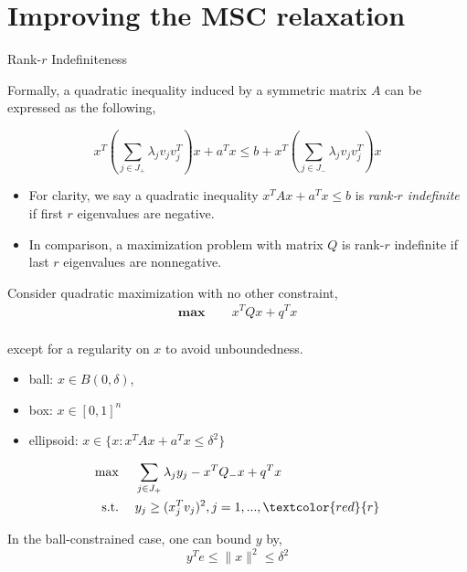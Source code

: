 \documentclass[aspectratio=1610, 9pt]{beamer}
\newcommand{\mx}{\mathbf{\max}\;}
\newcommand{\st}{\mathrm{s.t.\;}}
\newcommand{\red}[1]{\textcolor{red}{#1}}
\begin{document}
\section{Improving the MSC relaxation}
\begin{frame}[allowframebreaks]{Rank-\(r\) Indefiniteness}

  Formally, a quadratic inequality induced by a symmetric matrix \(A\) can be expressed as the following,

  \begin{equation}
    x^T \left(\sum_{j\in J_+} \lambda_j v_jv_j^T\right)x +a^Tx \le b + x^T\left(\sum_{j\in J_-} \lambda_j v_jv_j^T\right)x
  \end{equation}

  \begin{itemize}
    \item For clarity, we say a quadratic inequality \(x^TAx + a^Tx \le b\) is \emph{rank-\(r\) indefinite} if first \(r\) eigenvalues are negative.
    \item In comparison, a maximization problem with matrix \(Q\) is rank-\(r\) indefinite if last \(r\) eigenvalues are nonnegative.
  \end{itemize}

  \framebreak

  Consider quadratic maximization with no other constraint,
  \begin{equation}
    \begin{aligned}
      \mx \quad & x^TQx + q^Tx \\
    \end{aligned}
  \end{equation}

  except for a regularity on \(x\) to avoid unboundedness.
  \begin{itemize}
    \item ball: \(x\in B(0, \delta)\),
    \item box: \(x\in [0, 1]^n\)
    \item ellipsoid: \(x \in \{x: x^TAx + a^Tx \le \delta^2\}\)
  \end{itemize}

  \begin{equation}\label{eq:qp_unc_rr_conic}
    \begin{aligned}
      \mx \quad & \sum_{j\in J_+} \lambda_j y_j - x^TQ_-x  + q^Tx \\
      \st \quad & y_j \ge (x_j^T v_j)^2, j= 1, ..., \red{r}
    \end{aligned}
  \end{equation}

  In the ball-constrained case, one can bound \(y\) by,
  \begin{equation}
    y^Te \le \|x\|^2 \le \delta^2
  \end{equation}
\end{frame}
\end{document}
